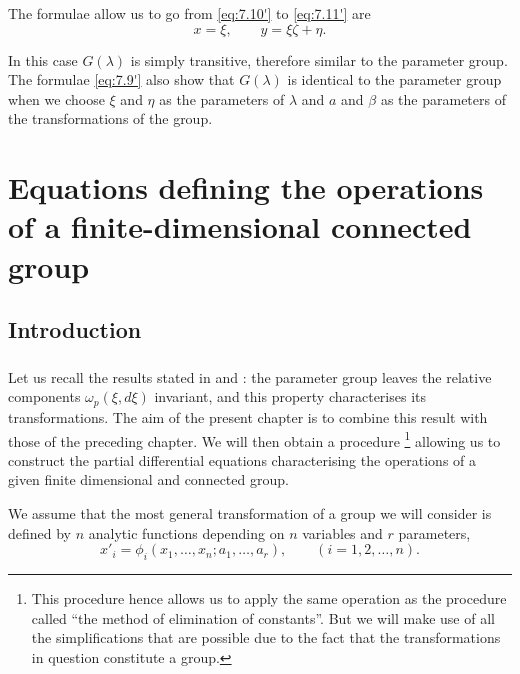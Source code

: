 {The formulae allow us to go from \eqref{eq:7.10'} to \eqref{eq:7.11'} are
\begin{equation}
  \label{eq:7.12}\tag{12$'$}
  x=\xi,\qquad y=\xi\zeta+\eta.
\end{equation}

In this case $G(\lambda)$ is simply transitive, therefore similar to the parameter group. The formulae \eqref{eq:7.9'} also show that $G(\lambda)$ is identical to the parameter group when we choose $\xi$ and $\eta$ as the parameters of $\lambda$ and $a$ and $\beta$ as the parameters of the transformations of the group.
}



\chapter{Equations defining the operations of a finite-dimensional connected group}
\label{cha:equat-defin-oper}

\section*{Introduction}
\label{sec:introduction-2}

\paragraph{}
\label{sec:105}
Let us recall the results stated in \pageref{sec:80} and \pageref{sec:83}: the parameter group leaves the relative components $\omega_{p}(\xi,d\xi)$ invariant, and this property characterises its transformations. The aim of the present chapter is to combine this result with those of the preceding chapter. We will then obtain a procedure \footnote{This procedure hence allows us to apply the same operation as the procedure called ``the method of elimination of constants''. But we will make use of all the simplifications that are possible due to the fact that the transformations in question constitute a group.} allowing us to construct the partial differential equations characterising the operations of a given finite dimensional and connected group. 

We assume that the most general transformation of a group we will consider is defined by $n$ analytic functions depending on $n$ variables and $r$ parameters,
\begin{equation}
  \label{eq:8.1}
  x'_{i}=\phi_{i}(x_{1},\dots,x_{n};a_{1},\dots,a_{r}),\qquad(i=1,2,\dots,n).
\end{equation}

